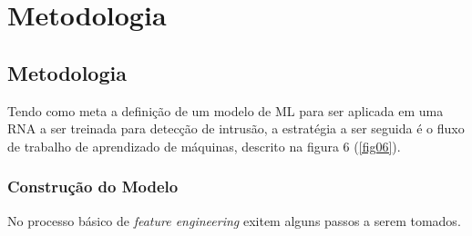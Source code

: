 \part{Metodologia}
\chapter[Metodologia]{Metodologia}

Tendo como meta a definição de um modelo de ML para ser aplicada em uma RNA a ser treinada para detecção de intrusão, a estratégia a ser seguida é o fluxo de trabalho de aprendizado de máquinas, descrito na figura 6 (\ref{fig06}).

\section{Construção do Modelo}
    No processo básico de \textit{feature engineering} exitem alguns passos a serem tomados.

